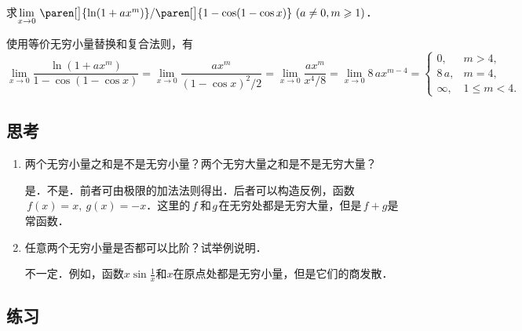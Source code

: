 \begin{example*}
  求\(\lim\limits_{x\to0} \,\paren[\big]{\ln(1+ax^m)}/\paren[\big]{1-\cos(1-\cos x)}\ (a \ne 0, m \ge 1)\)． %

  \begin{remark}
    使用等价无穷小量替换和复合法则，有
    \begin{equation*}
      \lim_{x\to0} \frac{\ln(1+ax^m)}{1-\cos(1-\cos x)}
      = \lim_{x\to0} \frac{ax^m}{(1-\cos x)^2\!/2}
      = \lim_{x\to0} \frac{ax^m}{x^4\!/8}
      = \lim_{x\to0} 8\,ax^{m-4} =
      \begin{cases}
        0, & m > 4, \\
        8\,a, & m = 4, \\
        \infty, & 1 \le m < 4.
      \end{cases}
    \end{equation*}
  \end{remark}
\end{example*}

\subsection*{思考}

\begin{enumerate}
\item 两个无穷小量之和是不是无穷小量？两个无穷大量之和是不是无穷大量？

  \ifshowsolp
    是．不是．前者可由极限的加法法则得出．后者可以构造反例，函数\(\,f(x) = x,\ g(x) = -x\)．这里的\(\,f\mkern1mu\)和\(\mkern1mu g\)在无穷处都是无穷大量，但是\(\,f+g\)是常函数．
  \fi

\item 任意两个无穷小量是否都可以比阶？试举例说明．

  \ifshowsolp
    不一定．例如，函数\(x \sin\frac1x\)和\(x\)在原点处都是无穷小量，但是它们的商发散．
  \fi
\end{enumerate}

\ifshowex
{}
\subsection*{练习}

